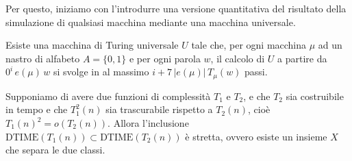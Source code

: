 Per questo, iniziamo con l'introdurre una versione quantitativa del risultato della simulazione di qualsiasi macchina mediante una macchina universale.

\begin{lemm}
Esiste una macchina di Turing universale $U$ tale che, per ogni macchina $\mu$ ad un nastro di alfabeto $A=\{0,1\}$ e per ogni parola $w$, il calcolo di $U$ a partire da $0^i\,e(\mu)\,w$ si svolge in al massimo $i+7\,|e(\mu)|\,T_\mu(w)$ passi.
\end{lemm}


\begin{theo}
Supponiamo di avere due funzioni di complessità $T_1$ e $T_2$, e che $T_2$ sia costruibile in tempo e che $T_1^2(n)$ sia trascurabile rispetto a $T_2(n)$, cioè $T_1(n)^2=o(T_2(n))$. Allora l'inclusione $\mathrm{DTIME}(T_1(n))\subset\mathrm{DTIME}(T_2(n))$ è stretta, ovvero esiste un insieme $X$ che separa le due classi.
\end{theo}

